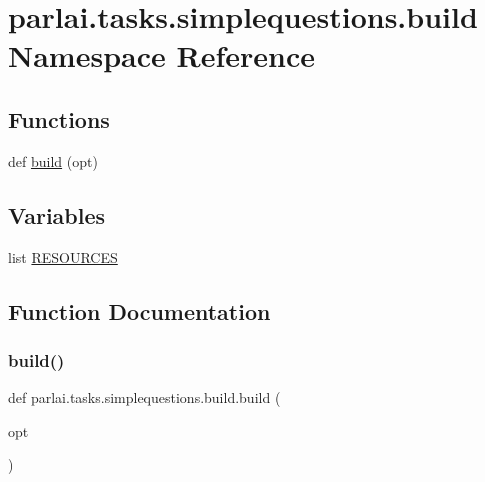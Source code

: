 \hypertarget{namespaceparlai_1_1tasks_1_1simplequestions_1_1build}{}\section{parlai.\+tasks.\+simplequestions.\+build Namespace Reference}
\label{namespaceparlai_1_1tasks_1_1simplequestions_1_1build}
\subsection*{Functions}
\begin{DoxyCompactItemize}
\item 
def \hyperlink{namespaceparlai_1_1tasks_1_1simplequestions_1_1build_adbe26bd28066100d5e756c1b34f8a9b9}{build} (opt)
\end{DoxyCompactItemize}
\subsection*{Variables}
\begin{DoxyCompactItemize}
\item 
list \hyperlink{namespaceparlai_1_1tasks_1_1simplequestions_1_1build_a42ab1f17c7dad67ca32e0da2aa5c6128}{R\+E\+S\+O\+U\+R\+C\+ES}
\end{DoxyCompactItemize}


\subsection{Function Documentation}
\mbox{\label{namespaceparlai_1_1tasks_1_1simplequestions_1_1build_adbe26bd28066100d5e756c1b34f8a9b9}} 
\subsubsection{\texorpdfstring{build()}{build()}}
{\footnotesize\ttfamily def parlai.\+tasks.\+simplequestions.\+build.\+build (\begin{DoxyParamCaption}\item[{}]{opt }\end{DoxyParamCaption})}



